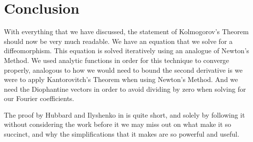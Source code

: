\documentclass[twoside,letterpaper,10pt]{article}
\numberwithin{equation}{section}
\begin{document}
\section{Conclusion}
\label{sec:conclusion}

With everything that we have discussed, the statement of Kolmogorov's Theorem
should now be very much readable.
We have an equation that we solve for a diffeomorphism.
This equation is solved iteratively using an analogue of Newton's Method.
We used analytic functions in order for this technique to converge properly,
analogous to how we would need to bound the second derivative is we were to
apply Kantorovitch's Theorem when using Newton's Method.
And we need the Diophantine vectors in order to avoid dividing by zero when
solving for our Fourier coefficients.

The proof by Hubbard and Ilyshenko in \cite{hi02} is quite short, and solely by
following it without considering the work before it we may miss out on what make
it so succinct, and why the simplifications that it makes are so powerful and
useful.



\end{document}
